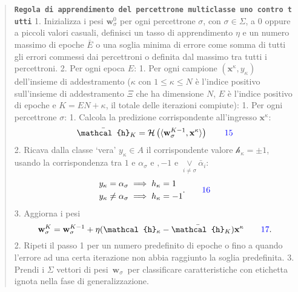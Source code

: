 \documentclass[
  letterpaper,
  DIV=11,
  numbers=noendperiod]{scrreprt}
\begin{document}
\begin{quote}
\textbf{\texttt{Regola\ di\ apprendimento\ del\ percettrone\ multiclasse\ \textquotesingle{}uno\ contro\ tutti\textquotesingle{}}}
1. Inizializza i pesi \(\mathbf{w}^0_\sigma\) per ogni percettrone
\(\sigma\), con \(\sigma \in \Sigma\), a \(0\) oppure a piccoli valori
casuali, definisci un tasso di apprendimento \(\eta\) e un numero
massimo di epoche \(\bar{E}\) o una soglia minima di errore come somma
di tutti gli errori commessi dai percettroni o definita dal massimo tra
tutti i percettroni. 2. Per ogni epoca \(E\): 1. Per ogni campione
\((\mathbf{x}^\kappa, y_\kappa)\) dell'insieme di addestramento
(\(\kappa\) con \(1≤\kappa≤N\) è l'indice positivo sull'insieme di
addestramento \(\Xi\) che ha dimensione \(N\), \(E\) è l'indice positivo
di epoche e \(K=EN+\kappa\), il totale delle iterazioni compiute): 1.
Per ogni percettrone \(\sigma\): 1. Calcola la predizione corrispondente
all'ingresso \(\mathbf{x}^\kappa\): \[
          \bar{\mathcal{h}}_K=\mathcal{H}\left(\langle\mathbf{w}^{K-1}_{\sigma},\mathbf{x}^\kappa\rangle\right)\tag*{\color{blue}{15}}
          \] 2. Ricava dalla classe `vera' \(y_{\kappa}\in A\) il
corrispondente valore \(\mathcal{h}_{\kappa}=\pm1\), usando la
corrispondenza tra \(1\) e \(\alpha_{\sigma}\) e \(,-1\) e
\({\underset{i\neq\sigma}{\lor}}\bar{\alpha}_i\): \[
          \begin{align}y_{\kappa}=\alpha_{\sigma}&\implies h_{\kappa}=1\\y_{\kappa}\neq\alpha_{\sigma}&\implies h_{\kappa}=-1\end{align}.\tag*{\color{blue}{16}}
          \] 3. Aggiorna i pesi \[
          \mathbf{w}^K_{\sigma}=\mathbf{w}^{K-1}_{\sigma}+\eta(\mathcal{h}_{\kappa}-\bar{\mathcal{h}}_K)\mathbf{x}^{\kappa}\tag*{\color{blue}{17}}.
          \] 2. Ripeti il passo 1 per un numero predefinito di epoche o
fino a quando l'errore ad una certa iterazione non abbia raggiunto la
soglia predefinita. 3. Prendi i \(\Sigma\) vettori di
pesi~\(\mathbf{w}_\sigma\)~per classificare caratteristiche con
etichetta ignota nella fase di generalizzazione.
\end{quote}
\end{document}
